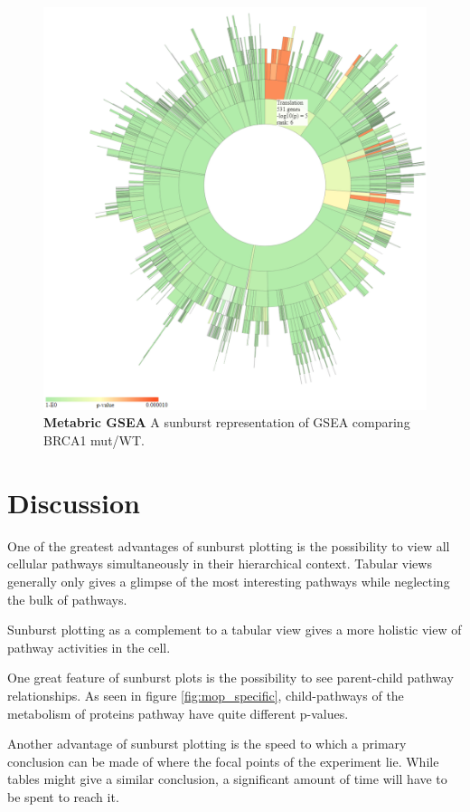 \documentclass[11pt]{article}
\begin{document}
\begin{figure}[htp]
\begin{center}
\includegraphics[width=0.96\linewidth,clip]{./img/BRCA1.png}
\caption{\label{fig:brca1} {\bf Metabric GSEA} A sunburst representation of GSEA comparing BRCA1 mut/WT.}
\end{center}
\end{figure}

\section*{Discussion}
  One of the greatest advantages of sunburst plotting is the possibility to view all cellular pathways simultaneously in their hierarchical context. Tabular views generally only gives a glimpse of the most interesting pathways while neglecting the bulk of pathways.

  Sunburst plotting as a complement to a tabular view gives a more holistic view of pathway activities in the cell.

  One great feature of sunburst plots is the possibility to see parent-child pathway relationships. As seen in figure \ref{fig:mop_specific}, child-pathways of the metabolism of proteins pathway have quite different p-values.

  Another advantage of sunburst plotting is the speed to which a primary conclusion can be made of where the focal points of the experiment lie. While tables might give a similar conclusion, a significant amount of time will have to be spent to reach it.
\end{document}
